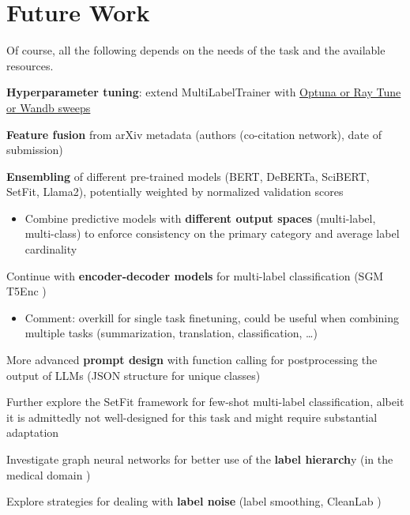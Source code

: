 \documentclass[11pt,letterpaper]{article}
\begin{document}
\section{Future Work}

Of course, all the following depends on the needs of the task and the available resources.
\small 
\begin{todolist}
  \item \textbf{Hyperparameter tuning}: extend MultiLabelTrainer with \href{https://huggingface.co/docs/transformers/en/hpo_train}{Optuna or Ray Tune or Wandb sweeps}
  \item \textbf{Feature fusion} from arXiv metadata (\eg authors (co-citation network), date of submission)
  \item \textbf{Ensembling} of different pre-trained models (\eg BERT, DeBERTa, SciBERT, SetFit, Llama2), potentially weighted by normalized validation scores
  \begin{itemize}
    \item Combine predictive models with \textbf{different output spaces} (\eg multi-label, multi-class) to enforce consistency on the primary category and average label cardinality 
  \end{itemize}
  \item Continue with \textbf{encoder-decoder models} for multi-label classification (\eg SGM \cite{syang2018sgm} T5Enc \cite{kementchedjhieva2023exploration})
  \begin{itemize}
    \item Comment: overkill for single task finetuning, could be useful when combining multiple tasks (summarization, translation, classification, \ldots)
  \end{itemize}
  \item More advanced \textbf{prompt design} with function calling for postprocessing the output of LLMs (\eg JSON structure for unique classes)
  \item Further explore the SetFit framework for few-shot multi-label classification, albeit it is admittedly not well-designed for this task and might require substantial adaptation
  \item Investigate graph neural networks for better use of the \textbf{label hierarch}y (\eg in the medical domain \cite{chi2024graph})
  \item Explore strategies for dealing with \textbf{label noise} (\eg label smoothing, CleanLab \cite{kumar2020robust,oyen2022robustness})
\end{todolist}
 
{\small


}
\end{document}
